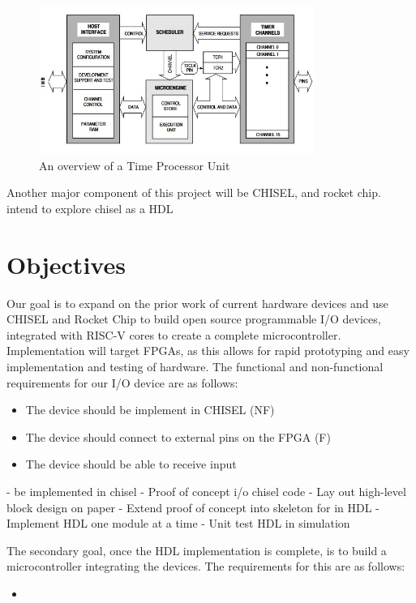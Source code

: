 \documentclass[a4paper,fleqn,12pt]{article}
\begin{document}
\begin{figure}[]
    \centering
    \includegraphics[width=0.8\textwidth]{../img/tpu.jpg}
    \caption{An overview of a Time Processor Unit \cite{tpu}}
    \label{fig:tpu}
\end{figure}

Another major component of this project will be CHISEL, and rocket chip. intend to explore chisel as a HDL

\section{Objectives}
Our goal is to expand on the prior work of current hardware devices and use CHISEL and Rocket Chip to build open source programmable I/O devices, integrated with RISC-V cores to create a complete microcontroller. Implementation will target FPGAs, as this allows for rapid prototyping and easy implementation and testing of hardware. The functional and non-functional requirements for our I/O device are as follows:
\begin{itemize}
    \item The device should be implement in CHISEL (NF)
    \item The device should connect to external pins on the FPGA (F)
    \item The device should be able to receive input
\end{itemize}


- be implemented in chisel
- Proof of concept i/o chisel code
- Lay out high-level block design on paper
- Extend proof of concept into skeleton for in HDL
- Implement HDL one module at a time
- Unit test HDL in simulation

The secondary goal, once the HDL implementation is complete, is to build a microcontroller integrating the devices. The requirements for this are as follows:
\begin{itemize}
    \item
\end{itemize}
\end{document}
